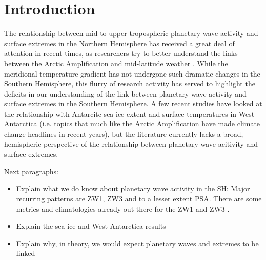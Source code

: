 \section{Introduction}\label{s:introduction}

The relationship between mid-to-upper tropospheric planetary wave activity and surface extremes in the Northern Hemisphere has received a great deal of attention in recent times, as researchers try to better understand the links between the Arctic Amplification and mid-latitude weather \citep[e.g.][]{Cohen2014,Screen2014}. While the meridional temperature gradient has not undergone such dramatic changes in the Southern Hemisphere, this flurry of research activity has served to highlight the deficits in our understanding of the link between planetary wave activity and surface extremes in the Southern Hemisphere. A few recent studies have looked at the relationship with Antarcitc sea ice extent \citep{Raphael2007,Raphael2014} and surface temperatures in West Antarctica \citep{Ding2011,Ding2013} (i.e. topics that much like the Arctic Amplification have made climate change headlines in recent years), but the literature currently lacks a broad, hemispheric perspective of the relationship between planetary wave acitivity and surface extremes. 

Next paragraphs:
\begin{itemize}
\item Explain what we do know about planetary wave activity in the SH: Major recurring patterns are ZW1, ZW3 and to a lesser extent PSA. There are some metrics and climatologies already out there for the ZW1 and ZW3 \citep{Raphael2004,Hobbs2007}.
\item Explain the sea ice and West Antarctica results
\item Explain why, in theory, we would expect planetary waves and extremes to be linked
\end{itemize}
